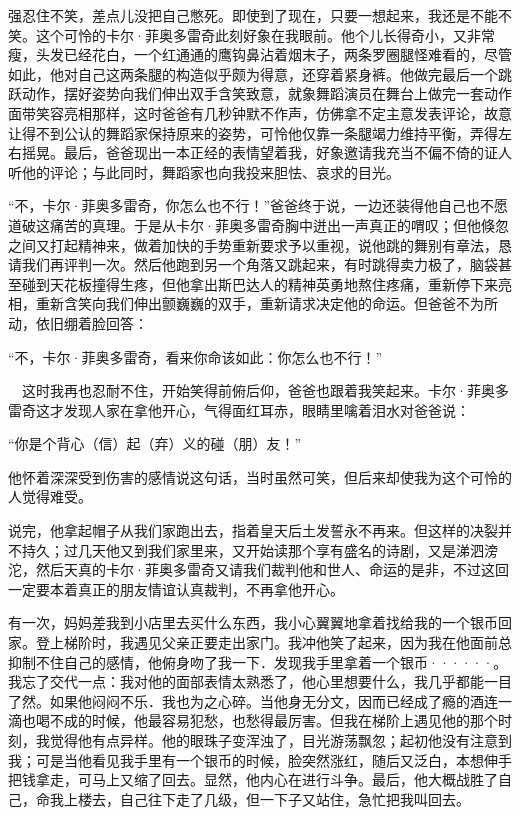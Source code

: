 \documentclass[12pt, UTF8]{ctexbook}
\begin{document}
强忍住不笑，差点儿没把自己憋死。即使到了现在，只要一想起来，我还是不能不笑。这个可怜的卡尔·菲奥多雷奇此刻好象在我眼前。他个儿长得奇小，又非常瘦，头发已经花白，一个红通通的鹰钩鼻沾着烟末子，两条罗圈腿怪难看的，尽管如此，他对自己这两条腿的构造似乎颇为得意，还穿着紧身裤。他做完最后一个跳跃动作，摆好姿势向我们伸出双手含笑致意，就象舞蹈演员在舞台上做完一套动作面带笑容亮相那样，这时爸爸有几秒钟默不作声，仿佛拿不定主意发表评论，故意让得不到公认的舞蹈家保持原来的姿势，可怜他仅靠一条腿竭力维持平衡，弄得左右摇晃。最后，爸爸现出一本正经的表情望着我，好象邀请我充当不偏不倚的证人听他的评论；与此同时，舞蹈家也向我投来胆怯、哀求的目光。
\par “不，卡尔·菲奥多雷奇，你怎么也不行！”爸爸终于说，一边还装得他自己也不愿道破这痛苦的真理。于是从卡尔·菲奥多雷奇胸中迸出一声真正的喟叹；但他倏忽之间又打起精神来，做着加快的手势重新要求予以重视，说他跳的舞别有章法，恳请我们再评判一次。然后他跑到另一个角落又跳起来，有时跳得卖力极了，脑袋甚至碰到天花板撞得生疼，但他拿出斯巴达人的精神英勇地熬住疼痛，重新停下来亮相，重新含笑向我们伸出颤巍巍的双手，重新请求决定他的命运。但爸爸不为所动，依旧绷着脸回答：
\par “不，卡尔·菲奥多雷奇，看来你命该如此：你怎么也不行！”
\par 　这时我再也忍耐不住，开始笑得前俯后仰，爸爸也跟着我笑起来。卡尔·菲奥多雷奇这才发现人家在拿他开心，气得面红耳赤，眼睛里噙着泪水对爸爸说：
\par “你是个背心（信）起（弃）义的碰（朋）友！”
\par 他怀着深深受到伤害的感情说这句话，当时虽然可笑，但后来却使我为这个可怜的人觉得难受。
\par 说完，他拿起帽子从我们家跑出去，指着皇天后土发誓永不再来。但这样的决裂并不持久；过几天他又到我们家里来，又开始读那个享有盛名的诗剧，又是涕泗滂沱，然后天真的卡尔·菲奥多雷奇又请我们裁判他和世人、命运的是非，不过这回一定要本着真正的朋友情谊认真裁判，不再拿他开心。
\par 有一次，妈妈差我到小店里去买什么东西，我小心翼翼地拿着找给我的一个银币回家。登上梯阶时，我遇见父亲正要走出家门。我冲他笑了起来，因为我在他面前总抑制不住自己的感情，他俯身吻了我一下．发现我手里拿着一个银币······。我忘了交代一点：我对他的面部表情太熟悉了，他心里想要什么，我几乎都能一目了然。如果他闷闷不乐．我也为之心碎。当他身无分文，因而已经成了瘾的酒连一滴也喝不成的时候，他最容易犯愁，也愁得最厉害。但我在梯阶上遇见他的那个时刻，我觉得他有点异样。他的眼珠子变浑浊了，目光游荡飘忽；起初他没有注意到我；可是当他看见我手里有一个银币的时候，脸突然涨红，随后又泛白，本想伸手把钱拿走，可马上又缩了回去。显然，他内心在进行斗争。最后，他大概战胜了自己，命我上楼去，自己往下走了几级，但一下子又站住，急忙把我叫回去。
\end{document}
